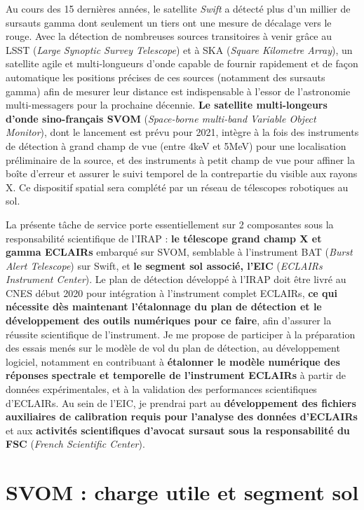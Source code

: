 \documentclass[11pt,onecolumn]{article}
\begin{document}
Au cours des 15 dernières années, le satellite \textit{Swift} a détecté plus d'un millier de sursauts gamma dont seulement un tiers ont une mesure de décalage vers le rouge. Avec la détection de nombreuses sources transitoires à venir grâce au LSST (\textit{Large Synoptic Survey Telescope}) et à SKA (\textit{Square Kilometre Array}), un satellite agile et multi-longueurs d'onde capable de fournir rapidement et de façon automatique les positions précises de ces sources (notamment des sursauts gamma) afin de mesurer leur distance est indispensable à l'essor de l'astronomie multi-messagers pour la prochaine décennie. \textbf{Le satellite multi-longeurs d'onde sino-français SVOM} (\textit{Space-borne multi-band Variable Object Monitor}), dont le lancement est prévu pour 2021, intègre à la fois des instruments de détection à grand champ de vue (entre 4keV et 5MeV) pour une localisation préliminaire de la source, et des instruments à petit champ de vue pour affiner la boîte d'erreur et assurer le suivi temporel de la contrepartie du visible aux rayons X. Ce dispositif spatial sera complété par un réseau de télescopes robotiques au sol.

La présente tâche de service porte essentiellement sur 2 composantes sous la responsabilité scientifique de l'IRAP : \textbf{le télescope grand champ X et gamma ECLAIRs} embarqué sur SVOM, semblable à l'instrument BAT (\textit{Burst Alert Telescope}) sur Swift, et \textbf{le segment sol associé, l'EIC} (\textit{ECLAIRs Instrument Center}). 
Le plan de détection développé à l'IRAP doit être livré au CNES début 2020 pour intégration à l'instrument complet ECLAIRs, \textbf{ce qui nécessite dès maintenant l'étalonnage du plan de détection et le développement des outils numériques pour ce faire}, afin d'assurer la réussite scientifique de l'instrument. Je me propose de participer à la préparation des essais menés sur le modèle de vol du plan de détection, au développement logiciel, notamment en contribuant à \textbf{étalonner le modèle numérique des réponses spectrale et temporelle de l'instrument ECLAIRs} à partir de données expérimentales, et à la validation des performances scientifiques d'ECLAIRs. Au sein de l'EIC, je prendrai part au \textbf{développement des fichiers auxiliaires de calibration requis pour l'analyse des données d'ECLAIRs} et aux \textbf{activités scientifiques d'avocat sursaut sous la responsabilité du FSC} (\textit{French Scientific Center}).

\section{SVOM : charge utile et segment sol}
\end{document}

